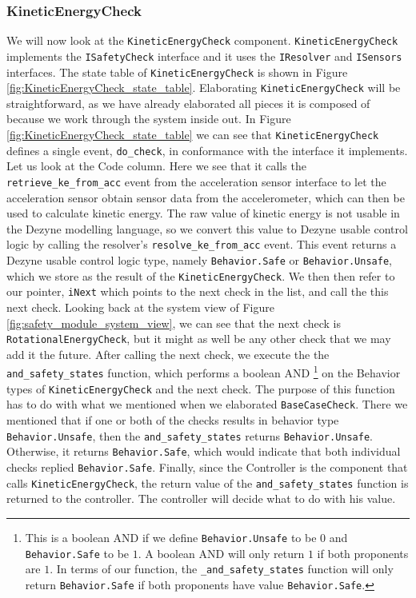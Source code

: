 \documentclass[12pt]{scrreprt}
\begin{document}
\subsubsection{KineticEnergyCheck}
We will now look at the \texttt{KineticEnergyCheck} component. \texttt{KineticEnergyCheck} implements the \texttt{ISafetyCheck} interface and it uses the \texttt{IResolver} and \texttt{ISensors} interfaces. The state table of \texttt{KineticEnergyCheck} is shown in Figure \ref{fig:KineticEnergyCheck_state_table}. Elaborating \texttt{KineticEnergyCheck} will be straightforward, as we have already elaborated all pieces it is composed of because we work through the system inside out. In Figure \ref{fig:KineticEnergyCheck_state_table} we can see that \texttt{KineticEnergyCheck} defines a single event, \texttt{do\_check}, in conformance with the interface it implements. Let us look at the Code column. Here we see that it calls the \texttt{retrieve\_ke\_from\_acc} event from the acceleration sensor interface to let the acceleration sensor obtain sensor data from the accelerometer, which can then be used to calculate kinetic energy. The raw value of kinetic energy is not usable in the Dezyne modelling language, so we convert this value to Dezyne usable control logic by calling the resolver's \texttt{resolve\_ke\_from\_acc} event. This event returns a Dezyne usable control logic type, namely \texttt{Behavior.Safe} or \texttt{Behavior.Unsafe}, which we store as the result of the \texttt{KineticEnergyCheck}. We then then refer to our pointer, \texttt{iNext} which points to the next check in the list, and call the this next check. Looking back at the system view of Figure \ref{fig:safety_module_system_view}, we can see that the next check is \texttt{RotationalEnergyCheck}, but it might as well be any other check that we may add it the future. After calling the next check, we execute the the \texttt{and\_safety\_states}  function, which performs a boolean AND \footnote{This is a boolean AND if we define \texttt{Behavior.Unsafe} to be $0$ and \texttt{Behavior.Safe} to be $1$. A boolean AND will only return $1$ if both proponents are $1$. In terms of our function, the \texttt{\_and\_safety\_states} function will only return \texttt{Behavior.Safe} if both proponents have value \texttt{Behavior.Safe}.} on the Behavior types of \texttt{KineticEnergyCheck} and the next check. The purpose of this function has to do with what we mentioned when we elaborated \texttt{BaseCaseCheck}. There we mentioned that if one or both of the checks results in behavior type \texttt{Behavior.Unsafe}, then the \texttt{and\_safety\_states} returns \texttt{Behavior.Unsafe}. Otherwise, it returns \texttt{Behavior.Safe}, which would indicate that both individual checks replied \texttt{Behavior.Safe}. Finally, since the Controller is the component that calls \texttt{KineticEnergyCheck}, the return value of the \texttt{and\_safety\_states} function is returned to the controller. The controller will decide what to do with his value.
\end{document}
